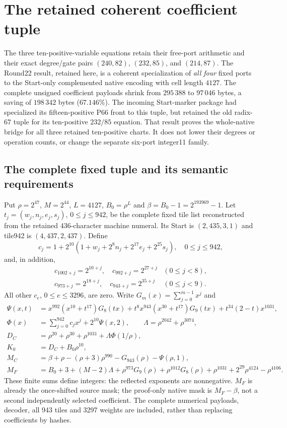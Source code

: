 \section{The retained coherent coefficient tuple}
\label{sec:start4127-positive10}
The three ten-positive-variable equations retain their free-port arithmetic
and their exact degree/gate pairs $(240,82)$, $(232,85)$, and $(214,87)$.
The Round22 result, retained here, is a coherent specialization of \emph{all four} fixed ports to
the Start-only complemented native encoding with cell length $4127$.
The complete unsigned coefficient payloads shrink from $295\,388$ to
$97\,046$ bytes, a saving of $198\,342$ bytes ($67.146\%$).
The incoming Start-marker package had specialized its fifteen-positive P66
front to this tuple, but retained the old radix-$67$ tuple for its ten-positive
$232/85$ equation. That result proves the whole-native bridge
for all three retained ten-positive charts. It does not lower their degrees
or operation counts, or change the separate six-port integer11 family.

\subsection{The complete fixed tuple and its semantic requirements}
Put $\rho=2^{47}$, $M=2^{44}$, $L=4127$, $B_0=\rho^L$ and
$\beta=B_0-1=2^{193969}-1$. Let $t_j=(w_j,n_j,e_j,s_j)$, $0\leq j\leq942$,
be the complete fixed tile list reconstructed from the retained 436-character
machine numeral. Its Start is $(2,435,3,1)$ and tile942 is $(4,437,2,437)$.
Define
\[
 c_j=1+2^{10}(1+w_j+2^8n_j+2^{17}e_j+2^{25}s_j),
 \quad 0\leq j\leq942,
\]
and, in addition,
\[
\begin{array}{ll}
c_{1002+j}=2^{10+j},\quad c_{992+j}=2^{27+j}&(0\leq j<8),\\
c_{973+j}=2^{18+j},\quad c_{943+j}=2^{35+j}&(0\leq j<9).
\end{array}
\]
All other $c_e$, $0\leq e\leq3296$, are zero. Write
$G_m(x)=\sum_{j=0}^{m-1}x^j$ and
\begin{align*}
\Psi(x,t)&=x^{992}(x^{10}+t^{17})G_8(tx)
 +t^8x^{943}(x^{30}+t^{17})G_9(tx)+t^{34}(2-t)x^{1031},\\
\Phi(x)&=\sum_{j=0}^{942}c_jx^j+2^{10}\Psi(x,2),\qquad
\Lambda=\rho^{2042}+\rho^{3074},\\
D_C&=\rho^{20}+\rho^{30}+\rho^{1031}+\Lambda\Phi(1/\rho),\\
K_0&=D_C+B_0\rho^{10},\\
M_C&=\beta+\rho-(\rho+3)\rho^{990}-G_{943}(\rho)-\Psi(\rho,1),\\
M_F&=B_0+3+(M-2)\Lambda+\rho^{973}G_9(\rho)
 +\rho^{1012}G_8(\rho)+\rho^{1031}
 +2^{29}\rho^{4124}-\rho^{4106}.
\end{align*}
These finite sums define integers: the reflected exponents are nonnegative.
$M_F$ is already the once-shifted source mask; the proof-only native mask is
$M_F-\beta$, not a second independently selected coefficient.
The complete numerical payloads, decoder, all 943 tiles and 3297 weights are
included, rather than replacing coefficients by hashes.

